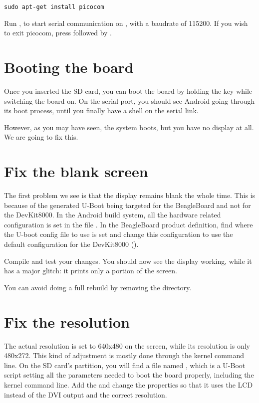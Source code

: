 \begin{verbatim}
sudo apt-get install picocom
\end{verbatim}

Run , to start serial
communication on , with a baudrate of 115200. If
you wish to exit picocom, press \code{[Ctrl][a]} followed by
\code{[Ctrl][x]}.

\section{Booting the board}

Once you inserted the SD card, you can boot the board by holding the
 key while switching the board on. On the serial port, you
should see Android going through its boot process, until you finally
have a shell on the serial link.

However, as you may have seen, the system boots, but you have no
display at all. We are going to fix this.

\section{Fix the blank screen}

The first problem we see is that the display remains blank the whole
time. This is because of the generated U-Boot being targeted for the
BeagleBoard and not for the DevKit8000. In the Android build system,
all the hardware related configuration is set in the file
. In the BeagleBoard product definition, find
where the U-boot config file to use is set and change this
configuration to use the default configuration for the DevKit8000
().

Compile and test your changes. You should now see the display working,
while it has a major glitch: it prints only a portion of the screen.

You can avoid doing a full rebuild by removing the
 directory.

\section{Fix the resolution}

The actual resolution is set to 640x480 on the screen, while its
resolution is only 480x272. This kind of adjustment is mostly done
through the kernel command line. On the SD card's 
partition, you will find a file named , which is a
U-Boot script setting all the parameters needed to boot the board
properly, including the kernel command line. Add the
 and change the  properties
so that it uses the LCD instead of the DVI output and the correct
resolution.

